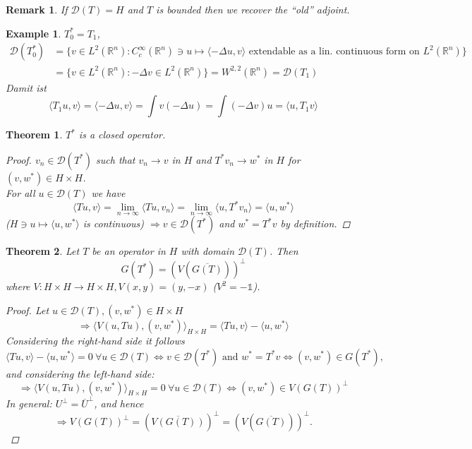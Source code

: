 \documentclass[12pt]{extreport} %
\newcommand{\R}{\mathbb{R}}
\newcommand{\DO}[1]{\mathcal{D}\left( {#1} \right)}
\theoremstyle{named}
\theoremstyle{nnamed}
\theoremstyle{itshape}
\newtheorem{theorem}{Theorem}  \counterwithin{theorem}{chapter}
\theoremstyle{normal}
\newtheorem*{example}{Example}
\newtheorem*{remark}{Remark}
\begin{document}
\begin{remark}
	If $\DO{T} = H$ and $T$ is bounded then we recover the \enquote{old} adjoint.
\end{remark}

\begin{example}
	$T_0^* = T_1$, 
	\begin{align*}
		\DO{T_0^*} & = \big\{ v \in L^2(\R^n) \colon C_c^\infty(\R^n) \ni u \mapsto \langle - \Delta u, v \rangle \text{ extendable as a lin. continuous form on } L^2(\R^n) \big\} \\
			& = \big\{ v \in L^2(\R^n) \colon - \Delta v \in L^2(\R^n) \big\} = W^{2,2}(\R^n) = \DO{T_1}
	\end{align*}
	Damit ist
	$$ \langle T_1 u, v \rangle = \langle - \Delta u, v \rangle = \int v \left( - \Delta u \right) = \int \left( - \Delta v \right) u = \langle u, T_1 v \rangle $$
\end{example}

\begin{theorem} \label{I.1:thm}
	$T^*$ is a closed operator.
	
	\begin{proof}
		$v_n \in \DO{T^*}$ such that $v_n \rightarrow v$ in $H$ and $T^* v_n \rightarrow w^*$ in $H$ for $(v, w^*) \in H \times H$. ~\\
		For all $u \in \DO{T}$ we have
			$$ \langle Tu, v \rangle = \lim_{n \rightarrow \infty} \langle T u, v_n \rangle = \lim_{n \rightarrow \infty} \langle u, T^* v_n \rangle = \langle u , w^* \rangle $$
		($H \ni u \mapsto \langle u, w^* \rangle$ is continuous) $\Rightarrow v \in \DO{T^*}$ and $w^* = T^* v$ by definition.
	\end{proof}
\end{theorem}

\begin{theorem} \label{I.2:thm}
	Let $T$ be an operator in $H$ with domain $\DO{T}$. Then
		$$ G \left( T^* \right) = \left( V \left( \overline{G(T)} \right) \right)^{\perp} $$
	where $V \colon H \times H \rightarrow H \times H, V(x, y) = (y, -x)$ ($V^2 = - \mathds{1}$).
	
	\begin{proof}
		Let $u \in \DO{T}, \left(v, w^* \right) \in H \times H$ 
			$$ \Rightarrow \langle V \left( u, Tu \right), \left( v, w^* \right) \rangle_{H \times H} = \langle T u, v \rangle - \langle u, w^* \rangle $$
		Considering the right-hand side it follows
		$$ \langle T u, v \rangle - \langle u, w^* \rangle = 0 ~ \forall u \in \DO{T} \iff v \in \DO{T^*} \text{ and } w^* = T^* v \iff \left( v, w^* \right) \in G\left( T^* \right), $$
		and considering the left-hand side:
		$$ \Rightarrow \langle V \left( u, Tu \right), \left( v, w^* \right) \rangle_{H \times H} = 0 ~ \forall u \in \DO{T} \iff \left( v, w^* \right) \in V \left( G(T) \right)^{\perp} $$
		In general: $U^{\perp} = \overline{U}^{\perp}$, and hence
		$$ \Rightarrow V \left( G(T) \right)^{\perp} = \left( \overline{V\left( G(T) \right)} \right)^{\perp} = \left( V \left( \overline{G(T)} \right) \right)^{\perp}. $$
	\end{proof}
\end{theorem}
\end{document}
